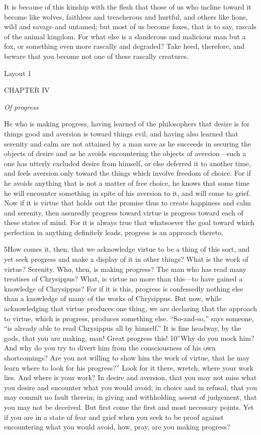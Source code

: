 It is because of this kinship with the flesh that those of us who incline toward it become like wolves, faithless and treacherous and hurtful, and others like lions, wild and savage and untamed; but most of us become foxes, that is to say, rascals of the animal kingdom. For what else is a slanderous and malicious man but a fox, or something even more rascally and degraded? Take heed, therefore, and beware that you become not one of these rascally creatures.


Layout 1

CHAPTER IV

\emph{Of progress}

He who is making progress, having learned of the philosophers that desire is for things good and aversion is toward things evil, and having also learned that serenity and calm are not attained by a man save as he succeeds in securing the objects of desire and as he avoids encountering the objects of aversion—such a one has utterly excluded desire from himself, or else deferred it to another time, and feels aversion only toward the things which involve freedom of choice. For if he avoids anything that is not a matter of free choice, he knows that some time he will encounter something in spite of his aversion to it, and will come to grief. Now if it is virtue that holds out the promise thus to create happiness and calm and serenity, then assuredly progress toward virtue is progress toward each of these states of mind. For it is always true that whatsoever the goal toward which perfection in anything definitely leads, progress is an approach thereto.

5How comes it, then, that we acknowledge virtue to be a thing of this sort, and yet seek progress and make a display of it in other things? What is the work of virtue? Serenity. Who, then, is making progress? The man who has read many treatises of Chrysippus? What, is virtue no more than this—to have gained a knowledge of Chrysippus? For if it is this, progress is confessedly nothing else than a knowledge of many of the works of Chrysippus. But now, while acknowledging that virtue produces one thing, we are declaring that the approach to virtue, which is progress, produces something else. ``So-and-so,'' says someone, ``is already able to read Chrysippus all by himself.'' It is fine headway, by the gods, that you are making, man! Great progress this! 10''Why do you mock him? And why do you try to divert him from the consciousness of his own shortcomings? Are you not willing to show him the work of virtue, that he may learn where to look for his progress?'' Look for it there, wretch, where your work lies. And where is your work? In desire and aversion, that you may not miss what you desire and encounter what you would avoid; in choice and in refusal, that you may commit no fault therein; in giving and withholding assent of judgement, that you may not be deceived. But first come the first and most necessary points. Yet if you are in a state of fear and grief when you seek to be proof against encountering what you would avoid, how, pray, are you making progress?

